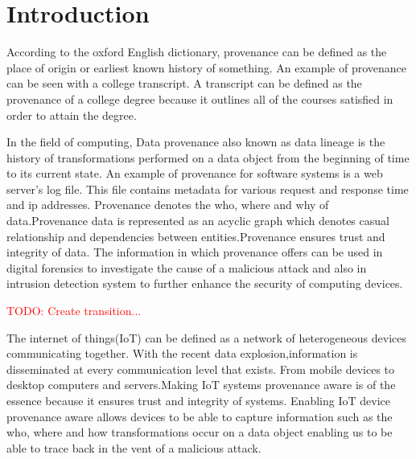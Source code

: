 \chapter{Introduction}\label{chapter:introduction}
According to the oxford English dictionary, provenance can be defined as the place of origin or earliest known history of something. An example of provenance can be seen with a college transcript. A transcript can be defined as the provenance of a college degree because it outlines all of the courses satisfied in order to attain the degree.

\par In the field of computing, Data provenance also known as data lineage is the history of transformations performed on a data object from the beginning of time to its current state. An example of provenance for software systems is a web server's log file. This file contains metadata for various request and response time and ip addresses. Provenance denotes the who, where and why of data.Provenance data is represented as an acyclic graph which denotes casual relationship and dependencies between entities.Provenance ensures trust and integrity of data. The information in which provenance offers can be used in digital forensics to investigate the cause of a malicious attack and also in intrusion detection system to further enhance the security of computing devices. 

 
\textcolor{red}{TODO: Create transition...}


The internet of things(IoT) can be defined as a network of heterogeneous devices communicating together. With the recent data explosion,information is disseminated at every communication level that exists. From mobile devices to desktop computers and servers.Making IoT systems provenance aware is of the essence because it ensures trust and  integrity of systems. Enabling IoT device provenance aware allows devices to be able to capture information such as the who, where and how transformations occur on a data object enabling us to be able to trace back in the vent of a malicious attack.



